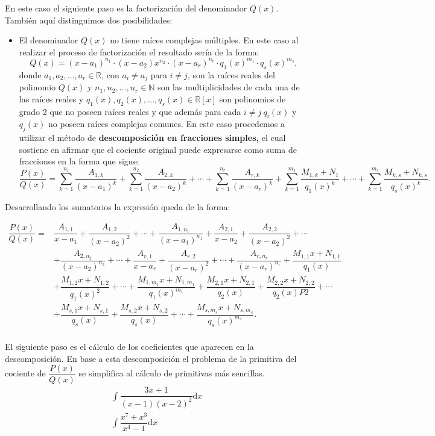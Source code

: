 En este caso el siguiente paso es la factorización del denominador $Q(x)$. También aquí distinguimos dos posibilidades:
\begin{itemize}
	\item El denominador $Q(x)$ no tiene raíces complejas múltiples. En este caso al realizar el proceso de factorización el resultado sería de la forma: \[ Q(x)=(x-a_1)^{n_1}\cdot(x-a_2)x^{n_2}\cdot(x-a_r)^{n_r}\cdot q_1(x)^{m_1}\cdot q_s(x)^{m_s}, \] donde $a_1, a_2,\hdots,a_r\in\mathbb{R}$, con $a_i\neq a_j$ para $i\neq j$, son la raíces reales del polinomio $Q(x)$ y $n_1,n_2,\hdots,n_r\in\mathbb{N}$ son las multiplicidades de cada una de las raíces reales y $q_1(x),q_2(x),\hdots,q_s(x)\in\mathbb{R}[x]$ son polinomios de grado 2 que no poseen raíces reales y que además para cada $i\neq j~q_i(x)$ y $q_j(x)$ no poseen raíces complejas comunes. En este caso procedemos a utilizar el método de \textbf{descomposición en fracciones simples,} el cual sostiene en afirmar que el cociente original puede expresarse como suma de fracciones en la forma que sigue: \[ \dfrac{P(x)}{Q(x)}=\sum_{k=1}^{n_1}\dfrac{A_{1,k}}{(x-a_1)^k}+\sum_{k=1}^{n_2}\dfrac{A_{2,k}}{(x-a_2)^k} +\cdots+\sum_{k=1}^{n_r}\dfrac{A_{r,k}}{(x-a_r)^k}+\sum_{k=1}^{m_1}\dfrac{M_{1,k}+N_1}{q_1(x)^k}+\cdots+\sum_{k=1}^{m_s}\dfrac{M_{k,s}+N_{k,s}}{q_s(x)^k}.\]
\end{itemize}
Desarrollando los sumatorios la expresión queda de la forma: 

$\begin{array}{ll}
	 \dfrac{P(x)}{Q(x)}  = & \dfrac{A_{1,1}}{x-a_1}+\dfrac{A_{1,2}}{(x-a_2)^2}+\cdots+\dfrac{A_{1,n_1}}{(x-a_1)^{n_1}}+\dfrac{A_{2,1}}{x-a_2}+\dfrac{A_{2,2}}{(x-a_2)^2}+\cdots\\  
	  & +\dfrac{A_{2,n_2}}{(x-a_2)^{n_2}}
	 +\cdots+\dfrac{A_{r,1}}{x-a_r}+\dfrac{A_{r,2}}{(x-a_r)^2}+\cdots+\dfrac{A_{r,n_r}}{(x-a_r)^{n_r}}+\dfrac{M_{1,1}x+N_{1,1}}{q_1(x)}\\
	 & +\dfrac{M_{1,2}x+N_{1,2}}{q_1(x)^2}+\cdots+\dfrac{M_{1,m_1}x+N_{1,m_1}}{q_1(x)^{m_1}}+\dfrac{M_{2,1}x+N_{2,1}}{q_2(x)}+\dfrac{M_{2,2}x+N_{2,2}}{q_2(x)P2}+\cdots\\
	 & +\dfrac{M_{s,1}x+N_{s,1}}{q_s(x)}+\dfrac{M_{s,2}x+N_{s,2}}{q_s(x)}+\cdots+\dfrac{M_{s,m_s}x+N_{s,m_s}}{q_s(x)^{m_s}}.\\
\end{array}$

El siguiente paso es el cálculo de los coeficientes que aparecen en la descomposición. En base a esta descomposición el problema de la primitiva del cociente de $\dfrac{P(x)}{Q(x)}$ se simplifica al cálculo de primitivas más sencillas. \[ \begin{array}{c}
	\int\dfrac{3x+1}{(x-1)(x-2)^2}\mathrm{d}x\\
	\int\dfrac{x^7+x^3}{x^4-1}\mathrm{d}x
\end{array} \]

